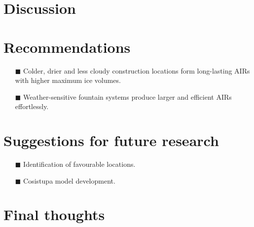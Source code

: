 \section{Discussion}

\section{Recommendations}

\begin{itemize} 

\item[\tiny{$\blacksquare$}] Colder, drier and less cloudy construction locations form long-lasting AIRs with
  higher maximum ice volumes. 

\item[\tiny{$\blacksquare$}] Weather-sensitive fountain systems produce larger and efficient AIRs effortlessly. 

\end{itemize}

\section{Suggestions for future research}

\begin{itemize} 

\item[\tiny{$\blacksquare$}] Identification of favourable locations.

\item[\tiny{$\blacksquare$}] Cosistupa model development.

\end{itemize}

\section{Final thoughts}
